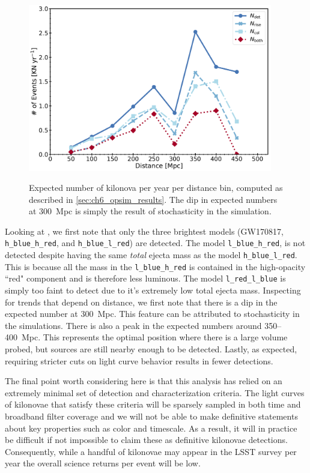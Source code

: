 \begin{figure}[!t]
\begin{center}
\hspace*{-0.1in}
\scalebox{1.}
{\includegraphics[width=0.95\textwidth]{./figs/chapter6/f1a.pdf}}
\caption{\singlespace Expected number of kilonova per year per distance bin, computed as described in \cref{sec:ch6_opsim_results}. The dip in expected numbers at 300~Mpc is simply the result of stochasticity in the simulation.}
\label{fig:ch6_eff_dist}
\end{center}
\end{figure}

\clearpage
Looking at , we first note that only the three brightest models (GW170817, {\tt h\_blue\_h\_red}, and {\tt h\_blue\_l\_red}) are detected. The model {\tt l\_blue\_h\_red}, is not detected despite having the same {\it total} ejecta mass as the model {\tt h\_blue\_l\_red}. This is because all the mass in the {\tt l\_blue\_h\_red} is contained in the high-opacity ``red" component and is therefore less luminous. The model {\tt l\_red\_l\_blue} is simply too faint to detect due to it's extremely low total ejecta mass. Inspecting  for trends that depend on distance, we first note that there is a dip in the expected number at 300~Mpc. This feature can be attributed to stochasticity in the simulations. There is also a peak in the expected numbers around 350--400~Mpc. This represents the optimal position where there is a large volume probed, but sources are still nearby enough to be detected. Lastly, as expected, requiring stricter cuts on light curve behavior results in fewer detections.

The final point worth considering here is that this analysis has relied on an extremely minimal set of detection and characterization criteria. The light curves of kilonovae that satisfy these criteria will be sparsely sampled in both time and broadband filter coverage and we will not be able to make definitive statements about key properties such as color and timescale. As a result, it will in practice be difficult if not impossible to claim these as definitive kilonovae detections. Consequently, while a handful of kilonovae may appear in the LSST survey per year the overall science returns per event will be low.

